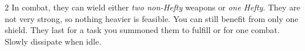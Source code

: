 \begin{multicols*}{2}
In combat, they can wield either \emph{two non-Hefty} weapons or \emph{one Hefty}. 
They are not very strong, so nothing heavier is feasible. You can still benefit from only one shield. 
They last for a task you summoned them to fulfill or for one combat. Slowly dissipate when idle.


\end{multicols*}